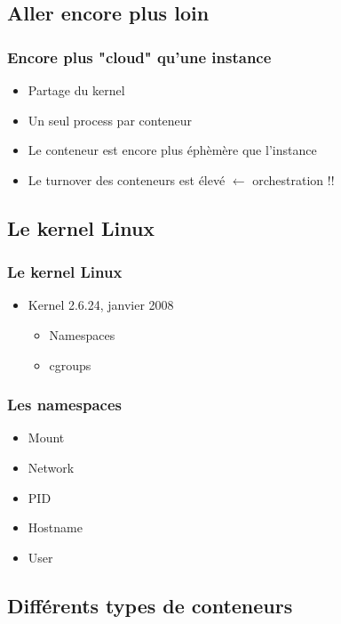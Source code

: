   \subsection[Conteneurs]{Aller encore plus loin}

  \begin{frame}
    \frametitle{Encore plus "cloud" qu'une instance}
    \begin{itemize}
      \item Partage du kernel
      \item Un seul process par conteneur
      \item Le conteneur est encore plus éphèmère que l'instance
      \item Le turnover des conteneurs est élevé $\leftarrow$ orchestration !!
    \end{itemize}
  \end{frame}

\subsection[Conteneurs]{Le kernel Linux}

  \begin{frame}
    \frametitle{Le kernel Linux}
    \begin{itemize}
      \item Kernel 2.6.24, janvier 2008
      \begin{itemize}
        \item Namespaces
        \item cgroups
      \end{itemize}
    \end{itemize}
  \end{frame}

 \begin{frame}
     \frametitle{Les namespaces}
    \begin{itemize}
      \item Mount
      \item Network
      \item PID
      \item Hostname
      \item User
    \end{itemize}
  \end{frame}

\subsection[Conteneurs]{Différents types de conteneurs}


